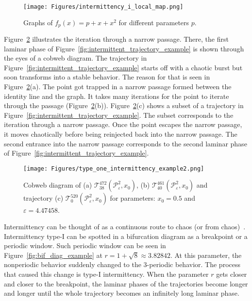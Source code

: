 \begin{figure}[!h]
    \centering
    \texttt{[image: Figures/intermittency\_i\_local\_map.png]}
    \caption{
        Graphs of $f_{p}(x) = p + x + x^2$ for different parameters $p$.
    }
    \label{fig:saddle_node_bifurcation}
\end{figure}

\par
Figure~\ref{fig:intermittent_cobweb_example} illustrates the iteration through a narrow passage.
There, the first laminar phase of Figure~\ref{fig:intermittent_trajectory_example} is shown through the eyes of a cobweb diagram.
The trajectory in Figure~\ref{fig:intermittent_trajectory_example} starts off with a chaotic burst but soon transforms into a stable behavior.
The reason for that is seen in Figure~\ref{fig:intermittent_cobweb_example}(a). The point got trapped in a narrow passage formed between the identity line and the graph.
It takes many iterations for the point to iterate through the passage (Figure~\ref{fig:intermittent_cobweb_example}(b)).
Figure~\ref{fig:intermittent_cobweb_example}(c) shows a subset of a trajectory in Figure~\ref{fig:intermittent_trajectory_example}.
The subset corresponds to the iteration through a narrow passage.
Once the point escapes the narrow passage, it moves chaotically before being reinjected back into the narrow passage.
The second entrance into the narrow passage corresponds to the second laminar phase of Figure~\ref{fig:intermittent_trajectory_example}.

\begin{figure}[!h]
    \centering
    \texttt{[image: Figures/type\_one\_intermittency\_example2.png]}
    \caption{
        Cobweb diagram of 
        (a) $\mathcal{T}^{472}_{38}(\mathcal{P}_{\varepsilon}^{2}, x_0)$,
        (b) $\mathcal{T}^{461}_{40}(\mathcal{P}_{\varepsilon}^{2}, x_0)$ and
        trajectory (c) $\mathcal{T}^{520}_{0}(\mathcal{P}_{\varepsilon}^{2}, x_0)$
        for parameters: $x_0 = 0.5$ and $\varepsilon = 4.47458$.
    }
    \label{fig:intermittent_cobweb_example}
\end{figure}

\par
Intermittency can be thought of as a continuous route to chaos (or from chaos)~\cite{Strogatz201854}.
Intermittency type-I can be spotted in a bifurcation diagram as a breakpoint or a periodic window.
Such periodic window can be seen in Figure~\ref{fig:bif_diag_example} at $r = 1+\sqrt{8} \approx 3.82842$.
At this parameter, the nonperiodic behavior suddenly changed to the $3$-periodic behavior.
The process that caused this change is type-I intermittency.
When the parameter $r$ gets closer and closer to the breakpoint, the laminar phases of the trajectories become longer and longer until the whole trajectory becomes an infinitely long laminar phase.


